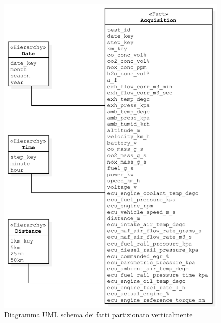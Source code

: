 \begin{figure}[H]
	\centering
	\includegraphics[width=1.\linewidth]{figures/class_fact_scheme} %
	\caption{Diagramma UML schema dei fatti partizionato verticalmente}
	\label{fig:ofm}
\end{figure}

